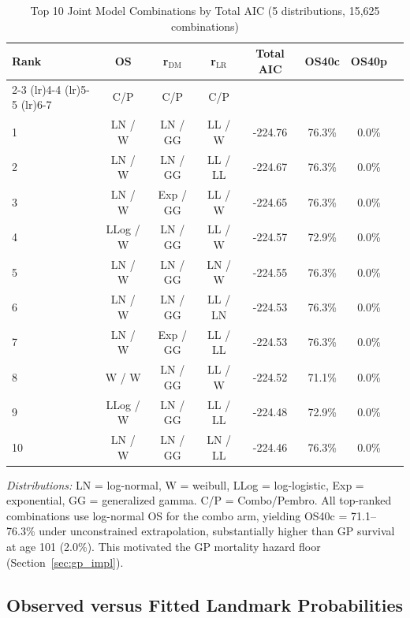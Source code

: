 \documentclass[11pt,a4paper]{article}
\begin{document}
\begin{table}[H]
\centering
\caption{Top 10 Joint Model Combinations by Total AIC\protect\footnotemark{} (5 distributions, 15,625 combinations)}
\label{tab:s4}
\begin{tabular}{lccccccc}
\toprule
\textbf{Rank} & \textbf{OS} & \textbf{r$_{\text{DM}}$} & \textbf{r$_{\text{LR}}$} & \textbf{Total AIC} & \textbf{OS40c} & \textbf{OS40p} \\
\cmidrule(lr){2-3} \cmidrule(lr){4-4} \cmidrule(lr){5-5} \cmidrule(lr){6-7}
 & C/P & C/P & C/P & & & \\
\midrule
1 & LN / W & LN / GG & LL / W & -224.76 & 76.3\% & 0.0\% \\
2 & LN / W & LN / GG & LL / LL & -224.67 & 76.3\% & 0.0\% \\
3 & LN / W & Exp / GG & LL / W & -224.65 & 76.3\% & 0.0\% \\
4 & LLog / W & LN / GG & LL / W & -224.57 & 72.9\% & 0.0\% \\
5 & LN / W & LN / GG & LN / W & -224.55 & 76.3\% & 0.0\% \\
6 & LN / W & LN / GG & LL / LN & -224.53 & 76.3\% & 0.0\% \\
7 & LN / W & Exp / GG & LL / LL & -224.53 & 76.3\% & 0.0\% \\
8 & W / W & LN / GG & LL / W & -224.52 & 71.1\% & 0.0\% \\
9 & LLog / W & LN / GG & LL / LL & -224.48 & 72.9\% & 0.0\% \\
10 & LN / W & LN / GG & LN / LL & -224.46 & 76.3\% & 0.0\% \\
\bottomrule
\end{tabular}
\end{table}
\noindent\textit{Distributions:} LN = log-normal, W = weibull, LLog = log-logistic, Exp = exponential, GG = generalized gamma. C/P = Combo/Pembro. All top-ranked combinations use log-normal OS for the combo arm, yielding OS40c = 71.1--76.3\% under unconstrained extrapolation, substantially higher than GP survival at age 101 (2.0\%). This motivated the GP mortality hazard floor (Section~\ref{sec:gp_impl}).

\subsection{Observed versus Fitted Landmark Probabilities}
\label{sec:obs_fitted}
\end{document}
